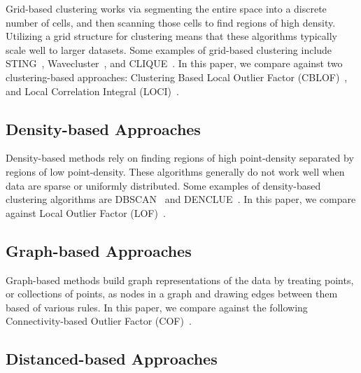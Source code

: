 Grid-based clustering works via segmenting the entire space into a discrete number of cells, and then scanning those cells to find regions of high density.
Utilizing a grid structure for clustering means that these algorithms typically scale well to larger datasets.
Some examples of grid-based clustering include
STING~\cite{wang1997sting},
Wavecluster~\cite{sheikholeslami2000wavecluster}, and
CLIQUE~\cite{agrawal1998automatic}. In this paper, we compare against two clustering-based approaches: Clustering Based Local Outlier Factor (CBLOF)~\cite{he2003cblof}, and
Local Correlation Integral (LOCI)~\cite{papadimitriou2003loci}.



\subsection{Density-based Approaches}
\label{subsec:introduction:density-based-approaches}

Density-based methods rely on finding regions of high point-density separated by regions of low point-density.
These algorithms generally do not work well when data are sparse or uniformly distributed.
Some examples of density-based clustering algorithms are
DBSCAN~\cite{ester1996density} and
DENCLUE~\cite{hinneburg1998efficient}.
In this paper, we compare against Local Outlier Factor (LOF)~\cite{breunig2000lof}.



\subsection{Graph-based Approaches}
\label{subsec:introduction:graph-based-approaches}

Graph-based methods build graph representations of the data by treating points, or collections of points, as nodes in a graph and drawing edges between them based of various rules. In this paper, we compare against the following Connectivity-based Outlier Factor (COF)~\cite{tang2002cof}.



\subsection{Distanced-based Approaches}
\label{subsec:related-works:distanced-based-approaches}

